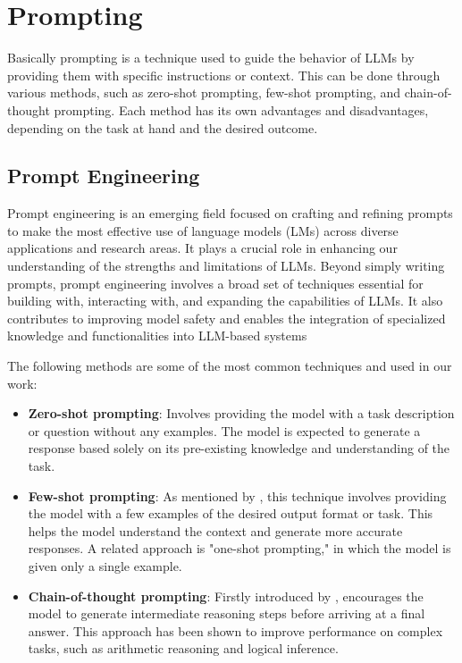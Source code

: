 \section{Prompting}

Basically prompting is a technique used to guide the behavior of LLMs by providing them with specific instructions or context. 
This can be done through various methods, such as zero-shot prompting, few-shot prompting, and chain-of-thought prompting. 
Each method has its own advantages and disadvantages, depending on the task at hand and the desired outcome.


\subsection{Prompt Engineering}

Prompt engineering is an emerging field focused on crafting and refining prompts to make the most effective use of language models (LMs) 
across diverse applications and research areas. It plays a crucial role in enhancing our understanding of the strengths and limitations of LLMs. 
Beyond simply writing prompts, prompt engineering involves a broad set of techniques essential for building with, interacting with, and expanding the capabilities of LLMs. 
It also contributes to improving model safety and enables the integration of specialized knowledge and functionalities into LLM-based systems

The following methods are some of the most common techniques and used in our work:

\begin{itemize}
    \item \textbf{Zero-shot prompting}: Involves providing the model with a task description or question without any examples. The model is expected to generate a response based solely on its pre-existing knowledge and understanding of the task.
    \item \textbf{Few-shot prompting}: As mentioned by \cite{gpt3Paper}, this technique involves providing the model with a few examples of the desired output format or task. This helps the model understand the context and generate more accurate responses. A related approach is "one-shot prompting," in which the model is given only a single example.
    \item \textbf{Chain-of-thought prompting}: Firstly introduced by \cite{chainofthought2023}, encourages the model to generate intermediate reasoning steps before arriving at a final answer. This approach has been shown to improve performance on complex tasks, such as arithmetic reasoning and logical inference.
\end{itemize}




